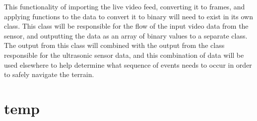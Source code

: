 \documentclass[10pt,letterpaper,onecolumn,journal]{IEEEtran}
\begin{document}
\par 
This functionality of importing the live video feed, converting it to frames, and applying functions to the data to convert it to binary will need to exist in its own class. This class will be responsible for the flow of the input video data from the sensor, and outputting the data as an array of binary values to a separate class. The output from this class will combined with the output from the class responsible for the ultrasonic sensor data, and this combination of data will be used elsewhere to help determine what sequence of events needs to occur in order to safely navigate the terrain.
%
%
\section{temp}

\end{document}
